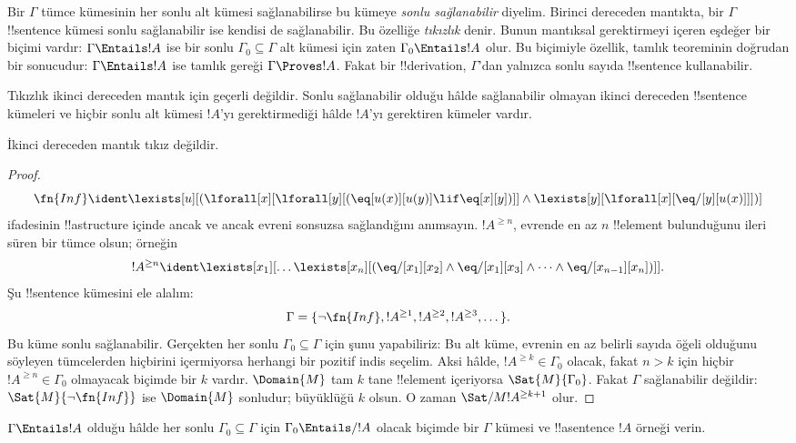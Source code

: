 



\begin{explain}
Bir $\Gamma$ tümce kümesinin her sonlu alt kümesi sağlanabilirse bu kümeye
\emph{sonlu sağlanabilir} diyelim. Birinci dereceden mantıkta, bir
$\Gamma$ !!{sentence} kümesi sonlu sağlanabilir ise kendisi de
sağlanabilir. Bu özelliğe \emph{tıkızlık} denir. Bunun mantıksal
gerektirmeyi içeren eşdeğer bir biçimi vardır: $\Gamma\Entails !A$ ise bir
sonlu $\Gamma_0\subseteq\Gamma$ alt kümesi için zaten
$\Gamma_0\Entails !A$ olur. Bu biçimiyle özellik, tamlık teoreminin doğrudan
bir sonucudur: $\Gamma\Entails !A$ ise tamlık gereği $\Gamma\Proves !A$.
Fakat bir !!{derivation}, $\Gamma$'dan yalnızca sonlu sayıda !!{sentence}
kullanabilir.

Tıkızlık ikinci dereceden mantık için geçerli değildir. Sonlu sağlanabilir
olduğu hâlde sağlanabilir olmayan ikinci dereceden !!{sentence} kümeleri ve
hiçbir sonlu alt kümesi $!A$'yı gerektirmediği hâlde $!A$'yı gerektiren
kümeler vardır.
\end{explain}


\begin{thm}
İkinci dereceden mantık tıkız değildir.
\end{thm}

\begin{proof}
\[
\fn{Inf} \ident \lexists[u][(\lforall[x][\lforall[y][(\eq[u(x)][u(y)]
      \lif \eq[x][y])]] \land \lexists[y][\lforall[x][\eq/[y][u(x)]]])]
\]
ifadesinin !!a{structure} içinde ancak ve ancak evreni sonsuzsa
sağlandığını anımsayın. $!A^{\ge n}$, evrende en az $n$
!!{element} bulunduğunu ileri süren bir tümce olsun; örneğin
\[
!A^{\ge n} \ident \lexists[x_1][\dots\lexists[x_n][(\eq/[x_1][x_2]
    \land \eq/[x_1][x_3] \land \dots \land \eq/[x_{n-1}][x_n])]].
\]
Şu !!{sentence} kümesini ele alalım:
\[
\Gamma = \{\lnot \fn{Inf}, !A^{\ge 1}, !A^{\ge 2}, !A^{\ge 3}, \dots\}.
\]
Bu küme sonlu sağlanabilir. Gerçekten her sonlu
$\Gamma_0\subseteq\Gamma$ için şunu yapabiliriz: Bu alt küme, evrenin en az
belirli sayıda öğeli olduğunu söyleyen tümcelerden hiçbirini içermiyorsa
herhangi bir pozitif indis seçelim. Aksi hâlde, $!A^{\ge k}\in\Gamma_0$
olacak, fakat $n>k$ için hiçbir $!A^{\ge n}\in\Gamma_0$ olmayacak biçimde
bir $k$ vardır. $\Domain{M}$ tam $k$ tane !!{element} içeriyorsa
$\Sat{M}{\Gamma_0}$. Fakat
$\Gamma$ sağlanabilir değildir: $\Sat{M}{\lnot\fn{Inf}}$ ise
$\Domain{M}$ sonludur; büyüklüğü $k$ olsun. O zaman
$\Sat/{M}{!A^{\ge k+1}}$ olur.
\end{proof}

\begin{prob}
$\Gamma\Entails !A$ olduğu hâlde her sonlu
$\Gamma_0\subseteq\Gamma$ için $\Gamma_0\Entails/ !A$ olacak biçimde bir
$\Gamma$ kümesi ve !!a{sentence} $!A$ örneği verin.
\end{prob}


